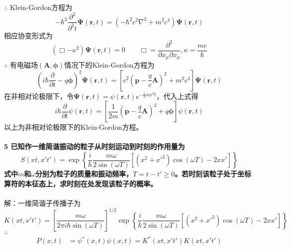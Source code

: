 \documentclass[12pt]{article}
\numberwithin{equation}{section}	 %
\begin{document}
\begin{spacing}{1.5}
\begin{equation}
\end{equation}\nonumber 		%
$\therefore$ Klein-Gordon方程为
\begin{equation}
-\hbar^{2}\frac{\partial^{2}}{\partial^{2} t}\bm\Psi\left(\bm{r},t\right) = \left(-\hbar^{2}c^{2}\nabla^{2}+m^{2}c^{4}\right)\bm\Psi\left(\bm{r},t\right)
\end{equation}
相应协变形式为
\begin{equation}
(\Box - \kappa^{2})\bm\Psi\left(\bm{r},t\right) = 0 \qquad \Box=\frac{\partial^{2}}{\partial x_{\mu}\partial x_{\mu}},\kappa=\frac{mc}{\hbar}
\end{equation}
$\therefore$ 有电磁场$\left(\bm{A},\bm\phi\right)$情况下的Klein-Gordon方程为
\begin{equation}
\left(i\hbar\frac{\partial}{\partial t}-q\bm\phi\right)^{2} \bm\Psi\left(\bm{r},t\right) = \left[c^{2}\left(\bm{p}-\frac{q}{c}\bm{A}\right)^{2}+m^{2}c^{4}\right] \bm\Psi\left(\bm{r},t\right)
\end{equation}
在非相对论极限下，令$\displaystyle \bm\Psi\left(\bm{r},t\right) = \psi\left(\bm{r},t\right)e^{-\frac{i}{\hbar}mc^{2}t}$，代入上式得
\begin{equation}
i\hbar\frac{\partial}{\partial t}\psi\left(\bm{r},t\right) = \left[\frac{1}{2m}\left( \bm{p}-\frac{q}{c}\bm{A} \right)^{2}+q\bm\phi\right]\psi\left(\bm{r},t\right)
\end{equation}
以上为非相对论极限下的Klein-Gordon方程。
~\\
~\\
\textbf{5 \quad 已知作一维简谐振动的粒子从时刻运动到时刻的作用量为
\begin{equation}\nonumber 		%
S(xt,x't') = \exp\left\{ \frac{i}{\hbar}\frac{m\omega}{2\sin(\omega T)} \left[ \left(x^{2}+x'^{2}\right)\cos(\omega T)-2xx' \right] \right\}
\end{equation}
式中$m$和$\omega$分别为粒子的质量和振动频率，$T=t-t'\ge0$。若时刻该粒子处于坐标算符的本征态上，求时刻在处发现该粒子的概率。}\\
~\\
解：一维简谐子传播子为
\begin{equation}\nonumber 		%
K(xt,x't') = \left[ \frac{m\omega}{2\pi i\hbar\sin(\omega T)} \right]^{1/2} \exp\left\{ \frac{i}{\hbar}\frac{m\omega}{2\sin(\omega T)} \left[ \left(x^{2}+x'^{2}\right)\cos(\omega T)-2xx' \right] \right\}
\end{equation}
$\therefore$
\begin{align*}
P(x,t) &= \psi^{*}(x,t)\psi(x,t) = K^{*}(xt,x't')K(xt,x't') \\

\end{align*}
\end{spacing}
\end{document}
